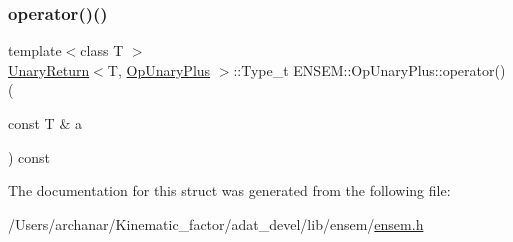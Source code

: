 \mbox{\label{structENSEM_1_1OpUnaryPlus_a508ecfc90631234c54b97cb705b14bc5}} 
\subsubsection{\texorpdfstring{operator()()}{operator()()}\hspace{0.1cm}{\footnotesize\ttfamily [2/2]}}
{\footnotesize\ttfamily template$<$class T $>$ \\
\mbox{\hyperlink{structENSEM_1_1UnaryReturn}{Unary\+Return}}$<$T, \mbox{\hyperlink{structENSEM_1_1OpUnaryPlus}{Op\+Unary\+Plus}} $>$\+::Type\+\_\+t E\+N\+S\+E\+M\+::\+Op\+Unary\+Plus\+::operator() (\begin{DoxyParamCaption}\item[{const T \&}]{a }\end{DoxyParamCaption}) const\hspace{0.3cm}{\ttfamily [inline]}}



The documentation for this struct was generated from the following file\+:\begin{DoxyCompactItemize}
\item 
/\+Users/archanar/\+Kinematic\+\_\+factor/adat\+\_\+devel/lib/ensem/\mbox{\hyperlink{lib_2ensem_2ensem_8h}{ensem.\+h}}\end{DoxyCompactItemize}
